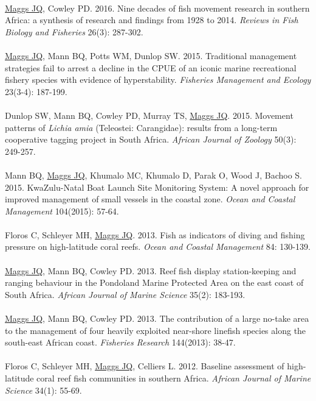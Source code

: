 \documentclass[10pt,a4paper]{article}
\begin{document}
\\
\underline{Maggs JQ}, Cowley PD. 2016. Nine decades of fish movement research in southern Africa: a synthesis of research and findings from 1928 to 2014. \textit{Reviews in Fish Biology and Fisheries} 26(3): 287-302.\\
\\
\underline{Maggs JQ}, Mann BQ, Potts WM, Dunlop SW. 2015. Traditional management strategies fail to arrest a decline in the CPUE of an iconic marine recreational fishery species with evidence of hyperstability. \textit{Fisheries Management and Ecology} 23(3-4): 187-199.\\
\\
Dunlop SW, Mann BQ, Cowley PD, Murray TS, \underline{Maggs JQ}. 2015. Movement patterns of \textit{Lichia amia} (Teleostei: Carangidae): results from a long-term cooperative tagging project in South Africa. \textit{African Journal of Zoology} 50(3): 249-257.\\
\\
Mann BQ, \underline{Maggs JQ}, Khumalo MC, Khumalo D, Parak O, Wood J, Bachoo S. 2015. KwaZulu-Natal Boat Launch Site Monitoring System: A novel approach for improved management of small vessels in the coastal zone. \textit{Ocean and Coastal Management} 104(2015): 57-64.\\
\\
Floros C, Schleyer MH, \underline{Maggs JQ}. 2013. Fish as indicators of diving and fishing pressure on high-latitude coral reefs. \textit{Ocean and Coastal Management} 84: 130-139.\\
\\ 
\underline{Maggs JQ}, Mann BQ, Cowley PD. 2013. Reef fish display station-keeping and ranging behaviour in the Pondoland Marine Protected Area on the east coast of South Africa. \textit{African Journal of Marine Science} 35(2): 183-193.\\
\\
\underline{Maggs JQ}, Mann BQ, Cowley PD. 2013. The contribution of a large no-take area to the management of four heavily exploited near-shore linefish species along the south-east African coast. \textit{Fisheries Research} 144(2013): 38-47.\\
\\
Floros C, Schleyer MH, \underline{Maggs JQ}, Celliers L. 2012. Baseline assessment of high-latitude coral reef fish communities in southern Africa. \textit{African Journal of Marine Science} 34(1): 55-69.\\
\\
\end{document}
